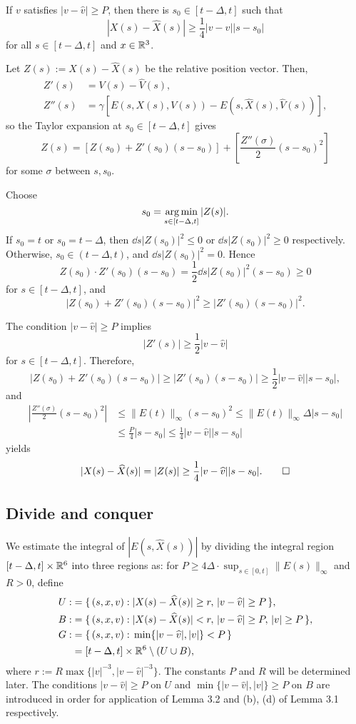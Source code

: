 \documentclass[12pt]{article}
\begin{document}
\begin{lem}
If $v$ satisfies $|v-\hat v|\ge P$, then there is $s_0\in[t-\Delta,t]$ such that
\[|X(s)-\hat X(s)|\ge\frac14|v-\hat v||s-s_0|\]
for all $s\in[t-\Delta,t]$ and $x\in\R^3$.
\end{lem}
\begin{pf}
Let $Z(s):=X(s)-\hat X(s)$ be the relative position vector.
Then,
\begin{align*}
Z'(s)&=V(s)-\hat V(s),\\
Z''(s)&=\gamma[E(s,X(s),V(s))-E(s,\hat X(s),\hat V(s))],
\end{align*}
so the Taylor expansion at $s_0\in[t-\Delta,t]$ gives
\[Z(s)=\left[Z(s_0)+Z'(s_0)(s-s_0)\right]+\left[\frac{Z''(\sigma)}2(s-s_0)^2\right]\]
for some $\sigma$ between $s,s_0$.

Choose
\[s_0=\argmin_{s\in[t-\Delta,t]}|Z(s)|.\]
If $s_0=t$ or $s_0=t-\Delta$, then $\dd{s}|Z(s_0)|^2\le0$ or $\dd{s}|Z(s_0)|^2\ge0$ respectively.
Otherwise, $s_0\in(t-\Delta,t)$, and $\dd{s}|Z(s_0)|^2=0$.
Hence
\[Z(s_0)\cdot Z'(s_0)(s-s_0)=\frac12\dd{s}|Z(s_0)|^2(s-s_0)\ge0\]
for $s\in[t-\Delta,t]$, and
\[|Z(s_0)+Z'(s_0)(s-s_0)|^2\ge|Z'(s_0)(s-s_0)|^2.\]

The condition $|v-\hat v|\ge P$ implies
\[|Z'(s)|\ge\frac12|v-\hat v|\]
for $s\in[t-\Delta,t]$.
Therefore,
\[|Z(s_0)+Z'(s_0)(s-s_0)|\ge|Z'(s_0)(s-s_0)|\ge\frac12|v-\hat v||s-s_0|,\]
and
\begin{align*}
|\frac{Z''(\sigma)}2(s-s_0)^2|
&\le\|E(t)\|_\infty(s-s_0)^2
\le\|E(t)\|_\infty\Delta|s-s_0|\\
&\le\frac P4|s-s_0|
\le\frac14|v-\hat v||s-s_0|
\end{align*}
yields
\[|X(s)-\hat X(s)|=|Z(s)|\ge\frac14|v-\hat v||s-s_0|.\qedhere\]
\end{pf}


\subsection{Divide and conquer}

We estimate the integral of $|E(s,\hat X(s))|$ by dividing the integral region $[t-\Delta,t]\times\R^6$ into three regions as:
for $P\ge4\Delta\cdot\sup_{s\in[0,t]}\|E(s)\|_\infty$ and $R>0$, define
\begin{align*}
U:&=\{\,(s,x,v):|X(s)-\hat X(s)|\ge r,\,|v-\hat v|\ge P\,\},\\
B:&=\{\,(s,x,v):|X(s)-\hat X(s)|<r,\,|v-\hat v|\ge P,\,|v|\ge P\,\},\\
G:&=\{\,(s,x,v):\,\min\{|v-\hat v|,|v|\}<P\,\}\\
&=[t-\Delta,t]\times\R^6\setminus(U\cup B),
\end{align*}
where $r:=R\max\{|v|^{-3},|v-\hat v|^{-3}\}$.
The constants $P$ and $R$ will be determined later.
The conditions $|v-\hat v|\ge P$ on $U$ and $\min\{|v-\hat v|,|v|\}\ge P$ on $B$ are introduced in order for application of Lemma 3.2 and (b), (d) of Lemma 3.1 respectively.
\end{document}

